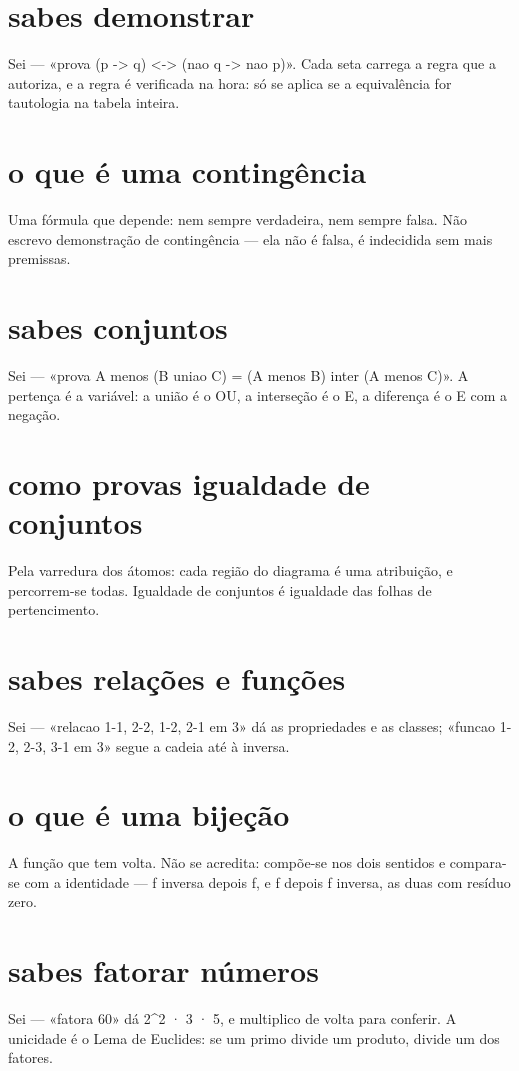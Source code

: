 \documentclass[11pt,a4paper]{article}
\begin{document}
\section{sabes demonstrar}
Sei --- «prova (p -> q) <-> (nao q -> nao p)». Cada seta carrega a regra que a
autoriza, e a regra é verificada na hora: só se aplica se a equivalência for
tautologia na tabela inteira.

\section{o que é uma contingência}
Uma fórmula que depende: nem sempre verdadeira, nem sempre falsa. Não escrevo
demonstração de contingência --- ela não é falsa, é indecidida sem mais premissas.

\section{sabes conjuntos}
Sei --- «prova A menos (B uniao C) = (A menos B) inter (A menos C)». A pertença é a
variável: a união é o OU, a interseção é o E, a diferença é o E com a negação.

\section{como provas igualdade de conjuntos}
Pela varredura dos átomos: cada região do diagrama é uma atribuição, e percorrem-se
todas. Igualdade de conjuntos é igualdade das folhas de pertencimento.

\section{sabes relações e funções}
Sei --- «relacao 1-1, 2-2, 1-2, 2-1 em 3» dá as propriedades e as classes; «funcao 1-2,
2-3, 3-1 em 3» segue a cadeia até à inversa.

\section{o que é uma bijeção}
A função que tem volta. Não se acredita: compõe-se nos dois sentidos e compara-se com
a identidade --- f inversa depois f, e f depois f inversa, as duas com resíduo zero.

\section{sabes fatorar números}
Sei --- «fatora 60» dá 2\^{}2 · 3 · 5, e multiplico de volta para conferir. A unicidade
é o Lema de Euclides: se um primo divide um produto, divide um dos fatores.
\end{document}
